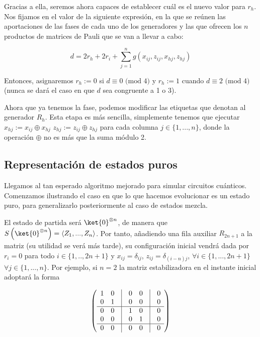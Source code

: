 \documentclass[11pt,a4paper,twoside,pdf]{article}
\numberwithin{equation}{section}
\begin{document}
	Gracias a ella, seremos ahora capaces de establecer cuál es el nuevo valor para $r_h$. Nos fijamos en el valor de la siguiente expresión, en la que se reúnen las aportaciones de las fases de cada uno de los generadores y las que ofrecen los $n$ productos de matrices de Pauli que se van a llevar a cabo: 
		
				\begin{equation*}
					d = 2r_h + 2r_i + \displaystyle\sum_{j=1}^n g(x_{ij},z_{ij},x_{hj},z_{hj})
				\end{equation*}
		
	Entonces, asignaremos $r_h:=0$ si $d \equiv 0 \text{ (mod 4)}$ y $r_h:=1$ cuando $d \equiv 2 \text{ (mod 4)}$ (nunca se dará el caso en que $d$ sea congruente a 1 o 3).
		
	Ahora que ya tenemos la fase, podemos modificar las etiquetas que denotan al generador $R_h$. Esta etapa es más sencilla, simplemente tenemos que ejecutar $x_{hj} := x_{ij} \oplus x_{hj}$ $z_{hj} := z_{ij} \oplus z_{hj}$ para cada columna $j\in\{1,...,n\}$, donde la operación $\oplus$ no es más que la suma módulo 2.
			
			
	\subsection{Representación de estados puros}
		
	Llegamos al tan esperado algoritmo mejorado para simular circuitos cuánticos. Comenzamos ilustrando el caso en que lo que hacemos evolucionar es un estado puro, para generalizarlo posteriormente al caso de estados mezcla.
		
	El estado de partida será $\ket{0}^{\otimes n}$, de manera que $S \left( \ket{0}^{\otimes n} \right) = \left\langle Z_1,...,Z_n \right\rangle $. Por tanto, añadiendo una fila auxiliar $R_{2n+1}$ a la matriz (su utilidad se verá más tarde), su configuración inicial vendrá dada por $r_i=0$ para todo $i \in \{1,..,2n+1\}$ y $x_{ij}=\delta_{ij}$, $z_{ij}=\delta_{(i-n)j}$, $\forall i\in\{1,...,2n+1\}$ $\forall j \in \{1,...,n\}$. Por ejemplo, si $n=2$ la matriz estabilizadora en el instante inicial adoptará la forma
			
			\begin{equation} \label{ec: matriz inicial ejemplo}
				\left( 
					\begin{array}{ccccccc}
						1 & 0 & \vline & 0 & 0 & \vline & 0 \\
						0 & 1 & \vline & 0 & 0 & \vline & 0	\\ 		\hline
						0 & 0 & \vline & 1 & 0 & \vline & 0 \\
						0 & 0 & \vline & 0 & 1 & \vline & 0	\\		\hline
						0 & 0 & \vline & 0 & 0 & \vline & 0
					\end{array}
				\right) 
			\end{equation}
		
\end{document}
